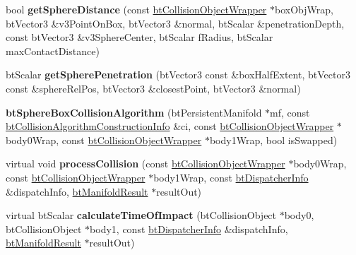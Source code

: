 \begin{DoxyCompactItemize}
\item 
\mbox{\label{classbtSphereBoxCollisionAlgorithm_a84fb21901c8dbbf9c8fca70ac173721f}} 
bool {\bfseries get\+Sphere\+Distance} (const \hyperlink{structbtCollisionObjectWrapper}{bt\+Collision\+Object\+Wrapper} $\ast$box\+Obj\+Wrap, bt\+Vector3 \&v3\+Point\+On\+Box, bt\+Vector3 \&normal, bt\+Scalar \&penetration\+Depth, const bt\+Vector3 \&v3\+Sphere\+Center, bt\+Scalar f\+Radius, bt\+Scalar max\+Contact\+Distance)
\item 
\mbox{\label{classbtSphereBoxCollisionAlgorithm_ab6566f6aa866da47034cb976fe1276a4}} 
bt\+Scalar {\bfseries get\+Sphere\+Penetration} (bt\+Vector3 const \&box\+Half\+Extent, bt\+Vector3 const \&sphere\+Rel\+Pos, bt\+Vector3 \&closest\+Point, bt\+Vector3 \&normal)
\item 
\mbox{\label{classbtSphereBoxCollisionAlgorithm_a0d289a90663e6b7a7863ba6530c3de78}} 
{\bfseries bt\+Sphere\+Box\+Collision\+Algorithm} (bt\+Persistent\+Manifold $\ast$mf, const \hyperlink{structbtCollisionAlgorithmConstructionInfo}{bt\+Collision\+Algorithm\+Construction\+Info} \&ci, const \hyperlink{structbtCollisionObjectWrapper}{bt\+Collision\+Object\+Wrapper} $\ast$body0\+Wrap, const \hyperlink{structbtCollisionObjectWrapper}{bt\+Collision\+Object\+Wrapper} $\ast$body1\+Wrap, bool is\+Swapped)
\item 
\mbox{\label{classbtSphereBoxCollisionAlgorithm_a4da8f9a89a8d7e2a92fc3afbde7a3bfc}} 
virtual void {\bfseries process\+Collision} (const \hyperlink{structbtCollisionObjectWrapper}{bt\+Collision\+Object\+Wrapper} $\ast$body0\+Wrap, const \hyperlink{structbtCollisionObjectWrapper}{bt\+Collision\+Object\+Wrapper} $\ast$body1\+Wrap, const \hyperlink{structbtDispatcherInfo}{bt\+Dispatcher\+Info} \&dispatch\+Info, \hyperlink{classbtManifoldResult}{bt\+Manifold\+Result} $\ast$result\+Out)
\item 
\mbox{\label{classbtSphereBoxCollisionAlgorithm_aca603030381225ff0f22acf017c82ac8}} 
virtual bt\+Scalar {\bfseries calculate\+Time\+Of\+Impact} (bt\+Collision\+Object $\ast$body0, bt\+Collision\+Object $\ast$body1, const \hyperlink{structbtDispatcherInfo}{bt\+Dispatcher\+Info} \&dispatch\+Info, \hyperlink{classbtManifoldResult}{bt\+Manifold\+Result} $\ast$result\+Out)

\end{DoxyCompactItemize}
